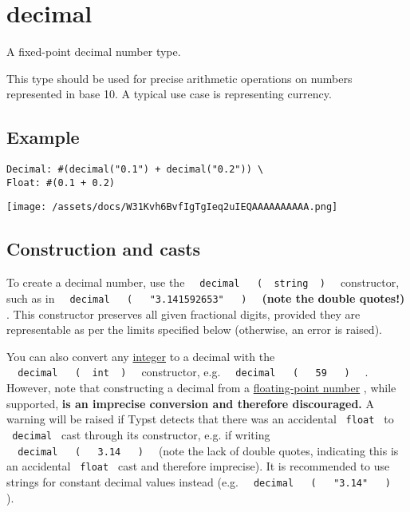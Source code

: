 \section{\texorpdfstring{{ decimal }}{ decimal }}\label{summary}

A fixed-point decimal number type.

This type should be used for precise arithmetic operations on numbers
represented in base 10. A typical use case is representing currency.

\subsection{Example}\label{example}

\begin{verbatim}
Decimal: #(decimal("0.1") + decimal("0.2")) \
Float: #(0.1 + 0.2)
\end{verbatim}

\texttt{[image: /assets/docs/W31Kvh6BvfIgTgIeq2uIEQAAAAAAAAAA.png]}

\subsection{Construction and casts}\label{construction-and-casts}

To create a decimal number, use the
\texttt{\ }{\texttt{\ decimal\ }}\texttt{\ }{\texttt{\ (\ }}\texttt{\ string\ }{\texttt{\ )\ }}\texttt{\ }
constructor, such as in
\texttt{\ }{\texttt{\ decimal\ }}\texttt{\ }{\texttt{\ (\ }}\texttt{\ }{\texttt{\ "3.141592653"\ }}\texttt{\ }{\texttt{\ )\ }}\texttt{\ }
\textbf{(note the double quotes!)} . This constructor preserves all
given fractional digits, provided they are representable as per the
limits specified below (otherwise, an error is raised).

You can also convert any
\href{/docs/reference/foundations/int/}{integer} to a decimal with the
\texttt{\ }{\texttt{\ decimal\ }}\texttt{\ }{\texttt{\ (\ }}\texttt{\ int\ }{\texttt{\ )\ }}\texttt{\ }
constructor, e.g.
\texttt{\ }{\texttt{\ decimal\ }}\texttt{\ }{\texttt{\ (\ }}\texttt{\ }{\texttt{\ 59\ }}\texttt{\ }{\texttt{\ )\ }}\texttt{\ }
. However, note that constructing a decimal from a
\href{/docs/reference/foundations/float/}{floating-point number} , while
supported, \textbf{is an imprecise conversion and therefore
discouraged.} A warning will be raised if Typst detects that there was
an accidental \texttt{\ float\ } to \texttt{\ decimal\ } cast through
its constructor, e.g. if writing
\texttt{\ }{\texttt{\ decimal\ }}\texttt{\ }{\texttt{\ (\ }}\texttt{\ }{\texttt{\ 3.14\ }}\texttt{\ }{\texttt{\ )\ }}\texttt{\ }
(note the lack of double quotes, indicating this is an accidental
\texttt{\ float\ } cast and therefore imprecise). It is recommended to
use strings for constant decimal values instead (e.g.
\texttt{\ }{\texttt{\ decimal\ }}\texttt{\ }{\texttt{\ (\ }}\texttt{\ }{\texttt{\ "3.14"\ }}\texttt{\ }{\texttt{\ )\ }}\texttt{\ }
).

